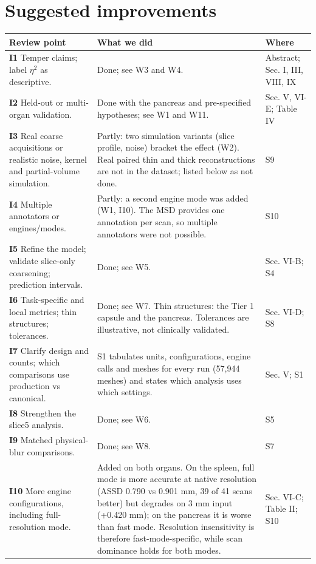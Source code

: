 \documentclass[11pt]{article}
\begin{document}
\section*{Suggested improvements}
\begin{longtable}{@{}>{\raggedright\arraybackslash}p{}>{\raggedright\arraybackslash}p{}>{\raggedright\arraybackslash}p{}@{}}
\toprule Review point & What we did & Where \\ \midrule\endhead
\textbf{I1} Temper claims; label $\eta^2$ as descriptive. & Done; see W3 and W4. & Abstract; Sec. I, III, VIII, IX \\ \midrule
\textbf{I2} Held-out or multi-organ validation. & Done with the pancreas and pre-specified hypotheses; see W1 and W11. & Sec. V, VI-E; Table IV \\ \midrule
\textbf{I3} Real coarse acquisitions or realistic noise, kernel and partial-volume simulation. & Partly: two simulation variants (slice profile, noise) bracket the effect (W2). Real paired thin and thick reconstructions are not in the dataset; listed below as not done. & S9 \\ \midrule
\textbf{I4} Multiple annotators or engines/modes. & Partly: a second engine mode was added (W1, I10). The MSD provides one annotation per scan, so multiple annotators were not possible. & S10 \\ \midrule
\textbf{I5} Refine the model; validate slice-only coarsening; prediction intervals. & Done; see W5. & Sec. VI-B; S4 \\ \midrule
\textbf{I6} Task-specific and local metrics; thin structures; tolerances. & Done; see W7. Thin structures: the Tier 1 capsule and the pancreas. Tolerances are illustrative, not clinically validated. & Sec. VI-D; S8 \\ \midrule
\textbf{I7} Clarify design and counts; which comparisons use production vs canonical. & S1 tabulates units, configurations, engine calls and meshes for every run (57,944 meshes) and states which analysis uses which settings. & Sec. V; S1 \\ \midrule
\textbf{I8} Strengthen the slice5 analysis. & Done; see W6. & S5 \\ \midrule
\textbf{I9} Matched physical-blur comparisons. & Done; see W8. & S7 \\ \midrule
\textbf{I10} More engine configurations, including full-resolution mode. & Added on both organs. On the spleen, full mode is more accurate at native resolution (ASSD 0.790 vs 0.901 mm, 39 of 41 scans better) but degrades on 3 mm input (+0.420 mm); on the pancreas it is worse than fast mode. Resolution insensitivity is therefore fast-mode-specific, while scan dominance holds for both modes. & Sec. VI-C; Table II; S10 \\ \midrule

\end{longtable}
\end{document}

